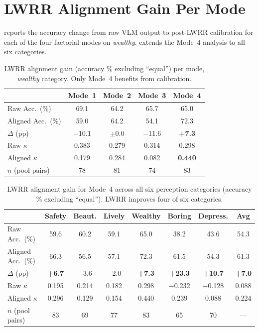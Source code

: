 \documentclass[runningheads]{llncs}
\begin{document}
\section{LWRR Alignment Gain Per Mode}
\label{sec:vrm_gain}

 reports the accuracy change from raw VLM output to post-LWRR calibration for each of the four factorial modes on \emph{wealthy}.
 extends the Mode~4 analysis to all six categories.

\begin{table}[ht]
\centering
\caption{LWRR alignment gain (accuracy \% excluding ``equal'') per mode, \emph{wealthy} category. Only Mode~4 benefits from calibration.}
\label{tab:vrm_gain}
\small
\begin{tabular}{lcccc}
\toprule
 & Mode~1 & Mode~2 & Mode~3 & Mode~4 \\
\midrule
Raw Acc.\ (\%)     & 69.1 & 64.2 & 65.7 & 65.0 \\
Aligned Acc.\ (\%) & 59.0 & 64.2 & 54.1 & 72.3 \\
$\Delta$ (pp)      & $-$10.1 & $\pm$0.0 & $-$11.6 & \textbf{+7.3} \\
\midrule
Raw $\kappa$       & 0.383 & 0.279 & 0.314 & 0.298 \\
Aligned $\kappa$   & 0.179 & 0.284 & 0.082 & \textbf{0.440} \\
$n$ (pool pairs)   & 78 & 81 & 74 & 83 \\
\bottomrule
\end{tabular}
\end{table}

\begin{table}[ht]
\centering
\caption{LWRR alignment gain for Mode~4 across all six perception categories (accuracy \% excluding ``equal''). LWRR improves four of six categories.}
\label{tab:vrm_gain_allcat}
\small
\setlength{\tabcolsep}{3.5pt}
\begin{tabular}{lcccccc|c}
\toprule
 & Safety & Beaut. & Lively & Wealthy & Boring & Depress. & Avg \\
\midrule
Raw Acc.\ (\%)     & 59.6 & 60.2 & 59.1 & 65.0 & 38.2 & 43.6 & 54.3 \\
Aligned Acc.\ (\%) & 66.3 & 56.5 & 57.1 & 72.3 & 61.5 & 54.3 & 61.3 \\
$\Delta$ (pp)      & \textbf{+6.7} & $-$3.6 & $-$2.0 & \textbf{+7.3} & \textbf{+23.3} & \textbf{+10.7} & \textbf{+7.0} \\
\midrule
Raw $\kappa$       & 0.195 & 0.214 & 0.182 & 0.298 & $-$0.232 & $-$0.128 & 0.088 \\
Aligned $\kappa$   & 0.296 & 0.129 & 0.154 & 0.440 & 0.239 & 0.088 & 0.224 \\
$n$ (pool pairs)   & 83 & 69 & 77 & 83 & 65 & 70 & --- \\
\bottomrule
\end{tabular}
\end{table}
\end{document}
